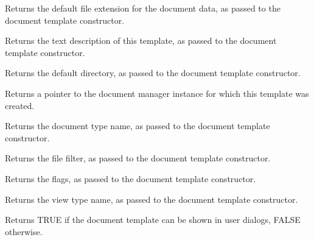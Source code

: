 Returns the default file extension for the document data, as passed to the document template constructor.



Returns the text description of this template, as passed to the document template constructor.



Returns the default directory, as passed to the document template constructor.



Returns a pointer to the document manager instance for which this template was created.



Returns the document type name, as passed to the document template constructor.



Returns the file filter, as passed to the document template constructor.



Returns the flags, as passed to the document template constructor.



Returns the view type name, as passed to the document template constructor.



Returns TRUE if the document template can be shown in user dialogs, FALSE otherwise.



